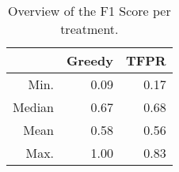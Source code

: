 \begin{table}[ht]
\centering
\begin{tabular}{rrr}
  \hline
 & Greedy & TFPR \\ 
  \hline
Min. & 0.09 & 0.17 \\ 
  Median & 0.67 & 0.68 \\ 
  Mean & 0.58 & 0.56 \\ 
  Max. & 1.00 & 0.83 \\ 
   \hline
\end{tabular}
\caption{Overview of the F1 Score per treatment.} 
\label{tab:results:rq4:summary:treatment:f1_Score}
\end{table}
